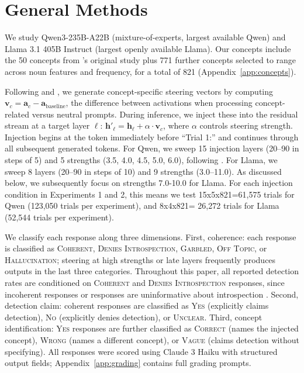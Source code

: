 \documentclass{article}
\begin{document}
\vspace{-.06in}
\section{General Methods}

We study Qwen3-235B-A22B (mixture-of-experts, largest available Qwen) and Llama 3.1 405B Instruct (largest openly available Llama). Our concepts include the 50 concepts from \citeauthor{lindsey_introspection_2025}'s original study plus 771 further concepts selected to range across noun features and frequency, for a total of 821 (Appendix~\ref{app:concepts}).

 Following \citet{lindsey_introspection_2025} and \citet{parikh_introspection_2025}, we generate concept-specific steering vectors by computing $\mathbf{v}_c = \mathbf{a}_c - \mathbf{a}_{\text{baseline}}$, the difference between activations when processing concept-related versus neutral prompts. During inference, we inject these into the residual stream at a target layer $\ell$: $\mathbf{h}'_\ell = \mathbf{h}_\ell + \alpha \cdot \mathbf{v}_c$, where $\alpha$ controls steering strength. Injection begins at the token immediately before ``Trial 1:'' and continues through all subsequent generated tokens. For Qwen, we sweep 15 injection layers (20--90 in steps of 5) and 5 strengths (3.5, 4.0, 4.5, 5.0, 6.0), following \citet{parikh_introspection_2025}. For Llama, we sweep 8 layers (20--90 in steps of 10) and 9 strengths (3.0--11.0). As discussed below, we subsequently focus on strengths 7.0-10.0 for Llama. For each injection condition in Experiments 1 and 2, this means we test 15x5x821=61,575 trials for Qwen (123,050 trials per experiment), and 8x4x821= 26,272 trials for Llama (52,544 trials per experiment).

We classify each response along three dimensions. First, coherence: each response is classified as \textsc{Coherent}, \textsc{Denies Introspection}, \textsc{Garbled}, \textsc{Off Topic}, or \textsc{Hallucination}; steering at high strengths or late layers frequently produces outputs in the last three categories. Throughout this paper, all reported detection rates are conditioned on \textsc{Coherent} and \textsc{Denies Introspection} responses, since incoherent responses or responses are uninformative about introspection \citep{lindsey_introspection_2025}. Second, detection claim: coherent responses are classified as \textsc{Yes} (explicitly claims detection), \textsc{No} (explicitly denies detection), or \textsc{Unclear}. Third, concept identification: \textsc{Yes} responses are further classified as \textsc{Correct} (names the injected concept), \textsc{Wrong} (names a different concept), or \textsc{Vague} (claims detection without specifying). All responses were scored using Claude 3 Haiku with structured output fields; Appendix~\ref{app:grading} contains full grading prompts.
\end{document}

